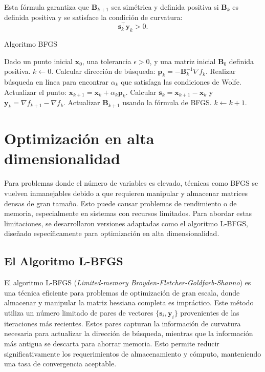Esta fórmula garantiza que $\mathbf{B}_{k+1}$ sea simétrica y definida positiva si $\mathbf{B}_k$ es definida positiva y se satisface la condición de curvatura:
\begin{equation}
\mathbf{s}_k^\top \mathbf{y}_k > 0.
\end{equation}

\begin{algorithm}[H]
\caption{Algoritmo BFGS}
\label{alg:bfgs}
\begin{algorithmic}[1]
\STATE Dado un punto inicial $\mathbf{x}_0$, una tolerancia $\epsilon > 0$, y una matriz inicial $\mathbf{B}_0$ definida positiva.
\STATE $k \gets 0$.
    \STATE Calcular dirección de búsqueda: $\mathbf{p}_k = -\mathbf{B}_k^{-1} \nabla f_k$.
    \STATE Realizar búsqueda en línea para encontrar $\alpha_k$ que satisfaga las condiciones de Wolfe.
    \STATE Actualizar el punto: $\mathbf{x}_{k+1} = \mathbf{x}_k + \alpha_k \mathbf{p}_k$.
    \STATE Calcular $\mathbf{s}_k = \mathbf{x}_{k+1} - \mathbf{x}_k$ y $\mathbf{y}_k = \nabla f_{k+1} - \nabla f_k$.
    \STATE Actualizar $\mathbf{B}_{k+1}$ usando la fórmula de BFGS.
    \STATE $k \gets k + 1$.
\ENDWHILE
\end{algorithmic}
\end{algorithm}

\section{Optimización en alta dimensionalidad}

Para problemas donde el número de variables es elevado, técnicas como BFGS se vuelven inmanejables debido a que requieren manipular y almacenar matrices densas de gran tamaño. Esto puede causar problemas de rendimiento o de memoria, especialmente en sistemas con recursos limitados. Para abordar estas limitaciones, se desarrollaron versiones adaptadas como el algoritmo L-BFGS, diseñado específicamente para optimización en alta dimensionalidad.

\subsection{El Algoritmo L-BFGS}

El algoritmo L-BFGS (\textit{Limited-memory Broyden-Fletcher-Goldfarb-Shanno}) es una técnica eficiente para problemas de optimización de gran escala, donde almacenar y manipular la matriz hessiana completa es impráctico. Este método utiliza un número limitado de pares de vectores $\{\mathbf{s}_i, \mathbf{y}_i\}$ provenientes de las iteraciones más recientes. Estos pares capturan la información de curvatura necesaria para actualizar la dirección de búsqueda, mientras que la información más antigua se descarta para ahorrar memoria. Esto permite reducir significativamente los requerimientos de almacenamiento y cómputo, manteniendo una tasa de convergencia aceptable.

